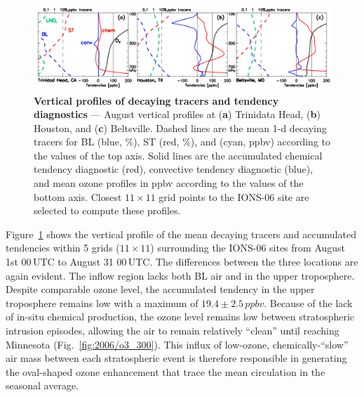 	\begin{figure}[t!]
		\centering
		 \label{fig:2006/tendency_vertical} 
		\includegraphics[width=1.0\textwidth]{tendency/vertical.png}
		\caption[Vertical profiles of decaying tracers and tendency diagnostics]{\textbf{Vertical profiles of decaying tracers
		and tendency diagnostics} --- August vertical profiles at ({\bf a}) Trinidata Head, ({\bf b}) Houston,
		and ({\bf c}) Beltsville. Dashed lines are the mean 1-d decaying tracers for BL (blue, \unit{\%}), ST (red, \unit{\%}), and {\lnox} (cyan,
		\unit{ppbv}) according to the values of the top axis. Solid lines are the accumulated chemical tendency diagnostic (red), convective
		tendency diagnostic (blue), and mean ozone profiles in \unit{ppbv} according to the values of the bottom axis. Closest $11\times11$
		grid points to the IONS-06 site are selected to compute these profiles.}\vspace{-.3in}
	\end{figure}

Figure~\ref{fig:2006/tendency_vertical} shows the vertical profile of the mean decaying tracers and accumulated
tendencies within 5 grids ($11\times11$) surrounding the
IONS-06 sites from August 1st 00\,\unit{UTC} to August 31 00\,\unit{UTC}. The differences between the three locations are again evident. The inflow
region lacks both BL air and {\lnox} in the upper troposphere. Despite comparable ozone level, the accumulated tendency in the upper
troposphere remains low with a maximum of $19.4\pm2.5\,\unit{ppbv}$. Because of the lack of in-situ chemical production, the ozone level remains
low between stratospheric intrusion episodes, allowing the air to remain relatively ``clean'' until reaching Minnesota (Fig.~\ref{fig:2006/o3_300}).
This influx of low-ozone, chemically-``slow'' air mass between each stratospheric event is therefore responsible in generating the oval-shaped
ozone enhancement that trace the mean circulation in the seasonal average.

